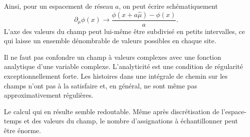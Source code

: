 Ainsi, pour un espacement de réseau \(a\), on peut écrire schématiquement
\begin{equation}
\partial_\mu\phi(x)
\longrightarrow
\frac{\phi(x+a\hat\mu)-\phi(x)}{a}.
\end{equation}
L’axe des valeurs du champ peut lui-même être subdivisé en petits intervalles, ce qui laisse un ensemble dénombrable de valeurs possibles en chaque site.

\begin{classroomqa}
\end{classroomqa}

Il ne faut pas confondre un champ à valeurs complexes avec une fonction analytique d’une variable complexe. L’analyticité est une condition de régularité exceptionnellement forte. Les histoires dans une intégrale de chemin sur les champs n’ont pas à la satisfaire et, en général, ne sont même pas approximativement régulières.

\begin{classroomqa}
\end{classroomqa}

Le calcul qui en résulte semble redoutable. Même après discrétisation de l’espace-temps et des valeurs du champ, le nombre d’assignations à échantillonner peut être énorme.


